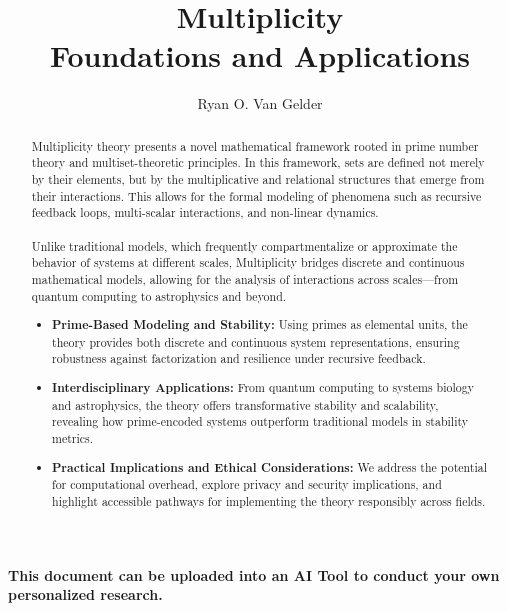 \documentclass{article}
\begin{document}
\title{Multiplicity\\Foundations and Applications}

\author{Ryan O. Van Gelder}

\maketitle

\begin{abstract}
Multiplicity theory presents a novel mathematical framework rooted in prime number theory and multiset-theoretic principles. In this framework, sets are defined not merely by their elements, but by the multiplicative and relational structures that emerge from their interactions. This allows for the formal modeling of phenomena such as recursive feedback loops, multi-scalar interactions, and non-linear dynamics.
\paragraph{}
Unlike traditional models, which frequently compartmentalize or approximate the behavior of systems at different scales, Multiplicity bridges discrete and continuous mathematical models, allowing for the analysis of interactions across scales—from quantum computing to astrophysics and beyond.

\begin{itemize}
    \item \textbf{Prime-Based Modeling and Stability:} Using primes as elemental units, the theory provides both discrete and continuous system representations, ensuring robustness against factorization and resilience under recursive feedback.
    \item \textbf{Interdisciplinary Applications:} From quantum computing to systems biology and astrophysics, the theory offers transformative stability and scalability, revealing how prime-encoded systems outperform traditional models in stability metrics.
    \item \textbf{Practical Implications and Ethical Considerations:} We address the potential for computational overhead, explore privacy and security implications, and highlight accessible pathways for implementing the theory responsibly across fields.
\end{itemize}
\end{abstract}
\begin{center}
    \textbf{This document can be uploaded into an AI Tool to conduct your own personalized research.}
\end{center}
\end{document}
